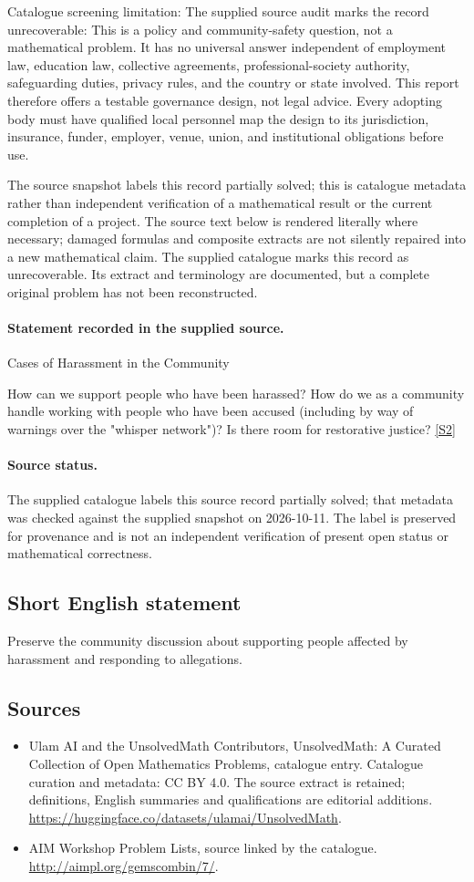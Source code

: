\documentclass[11pt]{article}
\begin{document}
Catalogue screening limitation: The supplied source audit marks the record unrecoverable: This is a policy and community-safety question, not a mathematical problem. It has no universal answer independent of employment law, education law, collective agreements, professional-society authority, safeguarding duties, privacy rules, and the country or state involved. This report therefore offers a testable governance design, not legal advice. Every adopting body must have qualified local personnel map the design to its jurisdiction, insurance, funder, employer, venue, union, and institutional obligations before use.

The source snapshot labels this record partially solved; this is catalogue metadata rather than independent verification of a mathematical result or the current completion of a project.
The source text below is rendered literally where necessary; damaged formulas and composite extracts are not silently repaired into a new mathematical claim.
The supplied catalogue marks this record as unrecoverable. Its extract and terminology are documented, but a complete original problem has not been reconstructed.
\paragraph{Statement recorded in the supplied source.}
Cases of Harassment in the Community

How can we support people who have been harassed? How do we as a community handle working with people who have been accused (including by way of warnings over the "whisper network")? Is there room for restorative justice? \href{http://aimpl.org/gemscombin/7/}{[S2]}
\paragraph{Source status.}
The supplied catalogue labels this source record partially solved; that metadata was checked against the supplied snapshot on 2026-10-11. The label is preserved for provenance and is not an independent verification of present open status or mathematical correctness.
\subsection{Short English statement}
Preserve the community discussion about supporting people affected by harassment and responding to allegations.
\subsection{Sources}
\begin{itemize}
\item[S1] Ulam AI and the UnsolvedMath Contributors, UnsolvedMath: A Curated Collection of Open Mathematics Problems, catalogue entry. Catalogue curation and metadata: CC BY 4.0. The source extract is retained; definitions, English summaries and qualifications are editorial additions.
\url{https://huggingface.co/datasets/ulamai/UnsolvedMath}.
\item[S2] AIM Workshop Problem Lists, source linked by the catalogue.
\url{http://aimpl.org/gemscombin/7/}.
\end{itemize}
\end{document}
